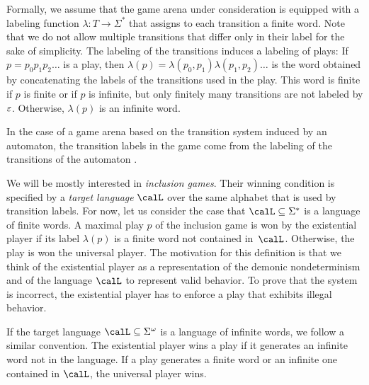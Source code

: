 \documentclass[../../diss.tex]{subfiles}
\begin{document}
Formally, we assume that the game arena under consideration is equipped with a labeling function $\lambda \colon T \to \Sigma^*$ that assigns to each transition a finite word.
Note that we do not allow multiple transitions that differ only in their label for the sake of simplicity.
The labeling of the transitions induces a labeling of plays:
If $p = p_0 p_1 p_2 \ldots$ is a play, then $\lambda(p) = \lambda(p_0,p_1) \lambda(p_1,p_2) \ldots$ is the word obtained by concatenating the labels of the transitions used in the play.
This word is finite if $p$ is finite or if $p$ is infinite, but only finitely many transitions are not labeled by $\varepsilon$.
Otherwise, $\lambda(p)$ is an infinite word.

In the case of a game arena based on the transition system induced by an automaton, the transition labels in the game come from the labeling of the transitions of the automaton .

We will be mostly interested in \emph{inclusion games}.
Their winning condition is specified by a \emph{target language} $\calL$ over the same alphabet that is used by transition labels.
For now, let us consider the case that $\calL \subseteq \Sigma^*$ is a language of finite words.
A maximal play $p$ of the inclusion game is won by the existential player if its label $\lambda(p)$ is a finite word not contained in~$\calL$.
Otherwise, the play is won the universal player.
The motivation for this definition is that we think of the existential player as a representation of the demonic nondeterminism and of the language $\calL$ to represent valid behavior.
To prove that the system is incorrect, the existential player has to enforce a play that exhibits illegal behavior.

If the target language $\calL \subseteq \Sigma^\omega$ is a language of infinite words, we follow a similar convention.
The existential player wins a play if it generates an infinite word not in the language.
If a play generates a finite word or an infinite one contained in $\calL$, the universal player wins.
\end{document}
